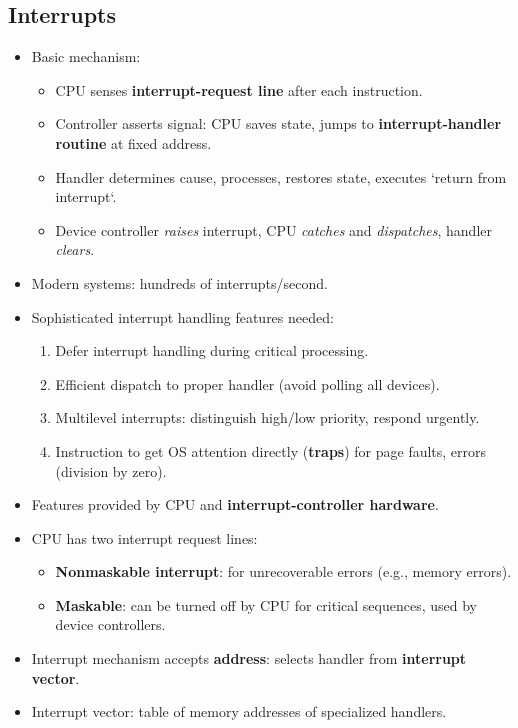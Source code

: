 \subsection{Interrupts}
\begin{itemize}
    \item Basic mechanism:
    \begin{itemize}
        \item CPU senses \textbf{interrupt-request line} after each instruction.
        \item Controller asserts signal: CPU saves state, jumps to \textbf{interrupt-handler routine} at fixed address.
        \item Handler determines cause, processes, restores state, executes `return from interrupt`.
        \item Device controller \textit{raises} interrupt, CPU \textit{catches} and \textit{dispatches}, handler \textit{clears}.
    \end{itemize}
    \item Modern systems: hundreds of interrupts/second.
    \item Sophisticated interrupt handling features needed:
    \begin{enumerate}
        \item Defer interrupt handling during critical processing.
        \item Efficient dispatch to proper handler (avoid polling all devices).
        \item Multilevel interrupts: distinguish high/low priority, respond urgently.
        \item Instruction to get OS attention directly (\textbf{traps}) for page faults, errors (division by zero).
    \end{enumerate}
    \item Features provided by CPU and \textbf{interrupt-controller hardware}.
    \item CPU has two interrupt request lines:
    \begin{itemize}
        \item \textbf{Nonmaskable interrupt}: for unrecoverable errors (e.g., memory errors).
        \item \textbf{Maskable}: can be turned off by CPU for critical sequences, used by device controllers.
    \end{itemize}
    \item Interrupt mechanism accepts \textbf{address}: selects handler from \textbf{interrupt vector}.
    \item Interrupt vector: table of memory addresses of specialized handlers.

\end{itemize}
